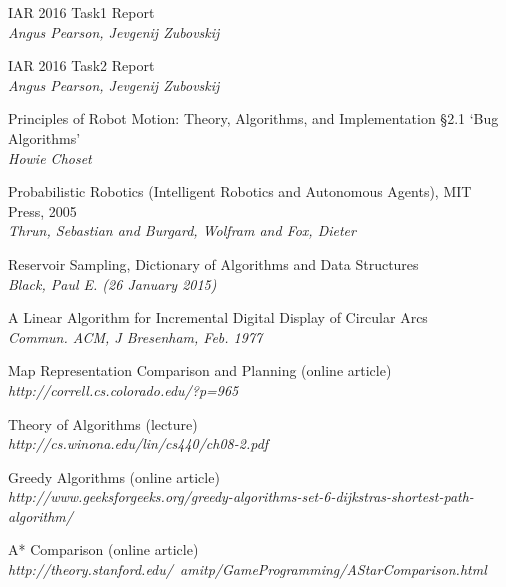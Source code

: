 \documentclass[11pt, a4paper]{article}
\begin{document}
\begin{thebibliography}{}

\par{IAR 2016 Task1 Report}
\\
\textit{Angus Pearson, Jevgenij Zubovskij}

\par{IAR 2016 Task2 Report}
\\
\textit{Angus Pearson, Jevgenij Zubovskij}


\par{Principles of Robot Motion: Theory, Algorithms, and Implementation \S2.1 `Bug Algorithms'}
\\
\textit{Howie Choset}


\par{Probabilistic Robotics (Intelligent Robotics and Autonomous Agents), MIT Press, 2005}
\\
\textit{Thrun, Sebastian and Burgard, Wolfram and Fox, Dieter}


\par{Reservoir Sampling, Dictionary of Algorithms and Data Structures}
\\
\textit{Black, Paul E. (26 January 2015)}


\par{A Linear Algorithm for Incremental Digital Display of Circular Arcs}
\\
\textit{Commun. ACM, J Bresenham, Feb. 1977}

\par{Map Representation Comparison and Planning (online article)}
\\
\textit{http://correll.cs.colorado.edu/?p=965}



\par{Theory of Algorithms (lecture)}
\\
\textit{http://cs.winona.edu/lin/cs440/ch08-2.pdf}

\par{Greedy Algorithms (online article)}
\\
\textit{http://www.geeksforgeeks.org/greedy-algorithms-set-6-dijkstras-shortest-path-algorithm/}

\par{A* Comparison (online article)}
\\
\textit{http://theory.stanford.edu/~amitp/GameProgramming/AStarComparison.html}


\end{thebibliography}
\end{document}
